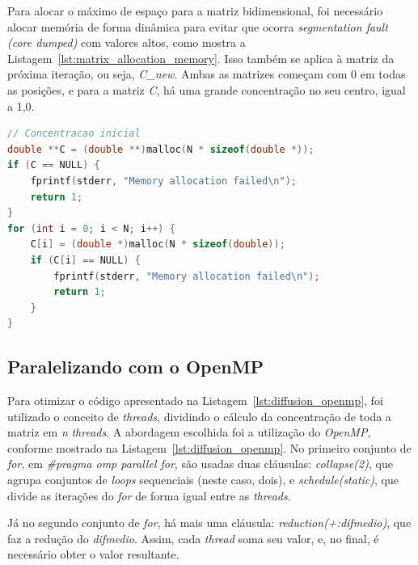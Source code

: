 \documentclass[12pt]{article}
\begin{document}
Para alocar o máximo de espaço para a matriz bidimensional, foi necessário alocar memória de forma dinâmica para evitar que ocorra \emph{segmentation fault (core dumped)} com valores altos, como mostra a Listagem~\ref{lst:matrix_allocation_memory}. Isso também se aplica à matriz da próxima iteração, ou seja, \emph{C\_new}. Ambas as matrizes começam com 0 em todas as posições, e para a matriz \emph{C}, há uma grande concentração no seu centro, igual a 1,0.

\begin{lstlisting}[language=C, caption={Alocação de memória para a matriz}, label={lst:matrix_allocation_memory}]
// Concentracao inicial
double **C = (double **)malloc(N * sizeof(double *));
if (C == NULL) {
    fprintf(stderr, "Memory allocation failed\n");
    return 1;
}
for (int i = 0; i < N; i++) {
    C[i] = (double *)malloc(N * sizeof(double));
    if (C[i] == NULL) {
        fprintf(stderr, "Memory allocation failed\n");
        return 1;
    }
}
\end{lstlisting}

\subsection{Paralelizando com o OpenMP}
Para otimizar o código apresentado na Listagem~\ref{lst:diffusion_openmp}, foi utilizado o conceito de \emph{threads}, dividindo o cálculo da concentração de toda a matriz em \emph{n} \emph{threads}. A abordagem escolhida foi a utilização do \emph{OpenMP}, conforme mostrado na Listagem~\ref{lst:diffusion_openmp}. No primeiro conjunto de \emph{for}, em \emph{\#pragma omp parallel for}, são usadas duas cláusulas: \emph{collapse(2)}, que agrupa conjuntos de \emph{loops} sequenciais (neste caso, dois), e \emph{schedule(static)}, que divide as iterações do \emph{for} de forma igual entre as \emph{threads}.

Já no segundo conjunto de \emph{for}, há mais uma cláusula: \emph{reduction(+:difmedio)}, que faz a redução do \emph{difmedio}. Assim, cada \emph{thread} soma seu valor, e, no final, é necessário obter o valor resultante.
\end{document}
